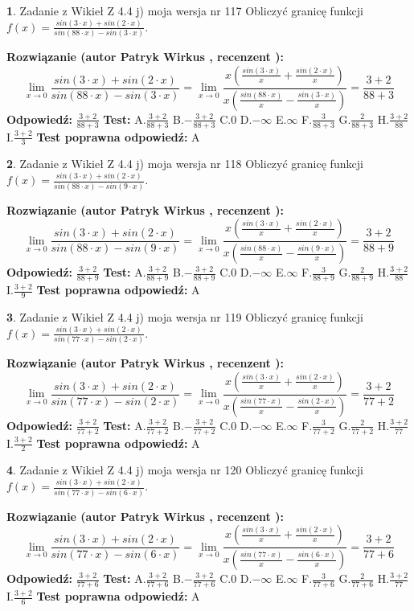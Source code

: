\documentclass[12pt, a4paper]{article}
\theoremstyle{definition} %
\newtheorem{zad}{}
\newcommand{\zadStart}[1]{\begin{zad}#1\newline}
\newcommand{\zadStop}{\end{zad}}
\newcommand{\rozwStart}[2]{\noindent \textbf{Rozwiązanie (autor #1 , recenzent #2): }\newline}
\newcommand{\rozwStop}{\newline}
\newcommand{\odpStart}{\noindent \textbf{Odpowiedź:}\newline}
\newcommand{\odpStop}{\newline}
\newcommand{\testStart}{\noindent \textbf{Test:}\newline}
\newcommand{\testStop}{\newline}
\newcommand{\kluczStart}{\noindent \textbf{Test poprawna odpowiedź:}\newline}
\newcommand{\kluczStop}{\newline}
\begin{document}
\zadStart{Zadanie z Wikieł Z 4.4 j) moja wersja nr 117}
Obliczyć granicę funkcji $f(x)=\frac{sin(3\cdot x) +sin(2\cdot x)}{sin(88\cdot x) -sin(3\cdot x)}$.
\zadStop
\rozwStart{Patryk Wirkus}{}
$$\lim\limits_{x\to 0}\frac{sin(3\cdot x) +sin(2\cdot x)}{sin(88\cdot x) -sin(3\cdot x)}=\lim\limits_{x\to 0}\frac{x(\frac{sin(3\cdot x)}{x}+\frac{sin(2\cdot x)}{x})}{x(\frac{sin(88\cdot x)}{x}-\frac{sin(3\cdot x)}{x})}=\frac{3+2}{88+3}$$
\rozwStop
\odpStart
$\frac{3+2}{88+3}$
\odpStop
\testStart
A.$\frac{3+2}{88+3}$
B.$-\frac{3+2}{88+3}$
C.$0$
D.$-\infty$
E.$\infty$
F.$\frac{3}{88+3}$
G.$\frac{2}{88+3}$
H.$\frac{3+2}{88}$
I.$\frac{3+2}{3}$
\testStop
\kluczStart
A
\kluczStop



\zadStart{Zadanie z Wikieł Z 4.4 j) moja wersja nr 118}
Obliczyć granicę funkcji $f(x)=\frac{sin(3\cdot x) +sin(2\cdot x)}{sin(88\cdot x) -sin(9\cdot x)}$.
\zadStop
\rozwStart{Patryk Wirkus}{}
$$\lim\limits_{x\to 0}\frac{sin(3\cdot x) +sin(2\cdot x)}{sin(88\cdot x) -sin(9\cdot x)}=\lim\limits_{x\to 0}\frac{x(\frac{sin(3\cdot x)}{x}+\frac{sin(2\cdot x)}{x})}{x(\frac{sin(88\cdot x)}{x}-\frac{sin(9\cdot x)}{x})}=\frac{3+2}{88+9}$$
\rozwStop
\odpStart
$\frac{3+2}{88+9}$
\odpStop
\testStart
A.$\frac{3+2}{88+9}$
B.$-\frac{3+2}{88+9}$
C.$0$
D.$-\infty$
E.$\infty$
F.$\frac{3}{88+9}$
G.$\frac{2}{88+9}$
H.$\frac{3+2}{88}$
I.$\frac{3+2}{9}$
\testStop
\kluczStart
A
\kluczStop



\zadStart{Zadanie z Wikieł Z 4.4 j) moja wersja nr 119}
Obliczyć granicę funkcji $f(x)=\frac{sin(3\cdot x) +sin(2\cdot x)}{sin(77\cdot x) -sin(2\cdot x)}$.
\zadStop
\rozwStart{Patryk Wirkus}{}
$$\lim\limits_{x\to 0}\frac{sin(3\cdot x) +sin(2\cdot x)}{sin(77\cdot x) -sin(2\cdot x)}=\lim\limits_{x\to 0}\frac{x(\frac{sin(3\cdot x)}{x}+\frac{sin(2\cdot x)}{x})}{x(\frac{sin(77\cdot x)}{x}-\frac{sin(2\cdot x)}{x})}=\frac{3+2}{77+2}$$
\rozwStop
\odpStart
$\frac{3+2}{77+2}$
\odpStop
\testStart
A.$\frac{3+2}{77+2}$
B.$-\frac{3+2}{77+2}$
C.$0$
D.$-\infty$
E.$\infty$
F.$\frac{3}{77+2}$
G.$\frac{2}{77+2}$
H.$\frac{3+2}{77}$
I.$\frac{3+2}{2}$
\testStop
\kluczStart
A
\kluczStop



\zadStart{Zadanie z Wikieł Z 4.4 j) moja wersja nr 120}
Obliczyć granicę funkcji $f(x)=\frac{sin(3\cdot x) +sin(2\cdot x)}{sin(77\cdot x) -sin(6\cdot x)}$.
\zadStop
\rozwStart{Patryk Wirkus}{}
$$\lim\limits_{x\to 0}\frac{sin(3\cdot x) +sin(2\cdot x)}{sin(77\cdot x) -sin(6\cdot x)}=\lim\limits_{x\to 0}\frac{x(\frac{sin(3\cdot x)}{x}+\frac{sin(2\cdot x)}{x})}{x(\frac{sin(77\cdot x)}{x}-\frac{sin(6\cdot x)}{x})}=\frac{3+2}{77+6}$$
\rozwStop
\odpStart
$\frac{3+2}{77+6}$
\odpStop
\testStart
A.$\frac{3+2}{77+6}$
B.$-\frac{3+2}{77+6}$
C.$0$
D.$-\infty$
E.$\infty$
F.$\frac{3}{77+6}$
G.$\frac{2}{77+6}$
H.$\frac{3+2}{77}$
I.$\frac{3+2}{6}$
\testStop
\kluczStart
A
\kluczStop
\end{document}
